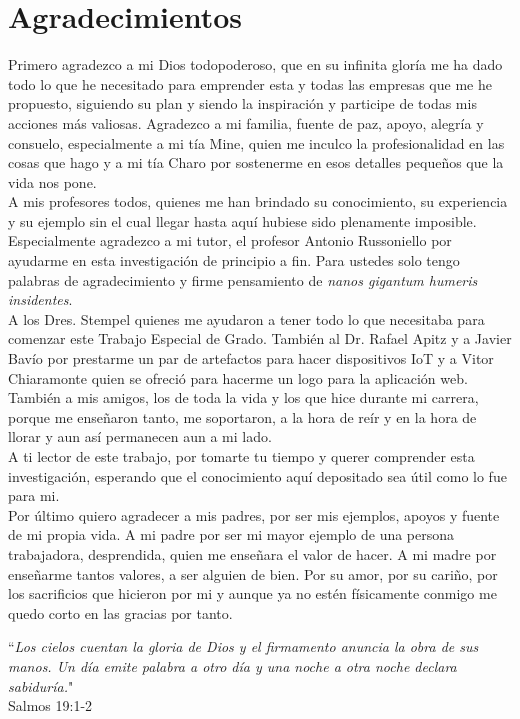\chapter*{Agradecimientos}
Primero agradezco a mi Dios todopoderoso, que en su infinita gloría me ha dado todo lo que he necesitado para emprender esta y todas las empresas que me he propuesto, siguiendo su plan y siendo la inspiración y participe de todas mis acciones más valiosas. Agradezco a mi familia, fuente de paz, apoyo, alegría y consuelo, especialmente a mi tía Mine, quien me inculco la profesionalidad en las cosas que hago y a mi tía Charo por sostenerme en esos detalles pequeños que la vida nos pone.\\

A mis profesores todos, quienes me han brindado su conocimiento, su experiencia y su ejemplo sin el cual llegar hasta aquí hubiese sido plenamente imposible. Especialmente agradezco a mi tutor, el profesor Antonio Russoniello por ayudarme en esta investigación de principio a fin. Para ustedes solo tengo palabras de agradecimiento y firme pensamiento de \textit{nanos gigantum humeris insidentes}.\\ 

A los Dres. Stempel quienes me ayudaron a tener todo lo que necesitaba para comenzar este Trabajo Especial de Grado. También al Dr. Rafael Apitz y a Javier Bavío por prestarme un par de artefactos para hacer dispositivos IoT y a Vitor Chiaramonte quien se ofreció para hacerme un logo para la aplicación web. También a mis amigos, los de toda la vida y los que hice durante mi carrera, porque me enseñaron tanto, me soportaron, a la hora de reír y en la hora de llorar y aun así permanecen aun a mi lado.\\

A ti lector de este trabajo, por tomarte tu tiempo y querer comprender esta investigación, esperando que el conocimiento aquí depositado sea útil como lo fue para mi.\\

Por último quiero agradecer a mis padres, por ser mis ejemplos, apoyos y fuente de mi propia vida. A mi padre por ser mi mayor ejemplo de una persona trabajadora, desprendida, quien me enseñara el valor de hacer. A mi madre por enseñarme tantos valores, a ser alguien de bien. Por su amor, por su cariño, por los sacrificios que hicieron por mi y aunque ya no estén físicamente conmigo me quedo corto en las gracias por tanto. 
\vspace{35pt}
\begin{flushright}
``\textit{Los cielos cuentan la gloria de Dios y el firmamento anuncia la obra de sus manos. Un día emite palabra a otro día y una noche a otra noche declara sabiduría.}"\\
Salmos 19:1-2
\end{flushright}





